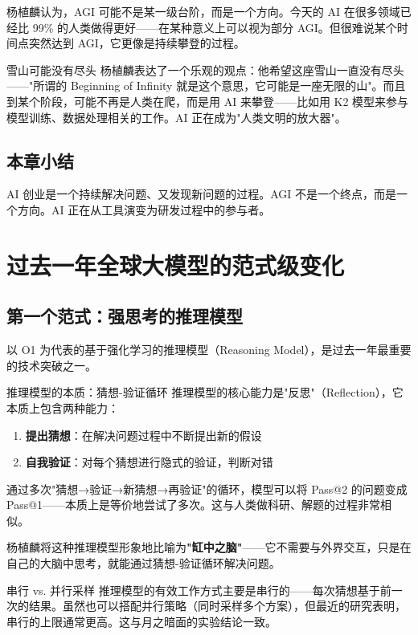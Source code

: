 \documentclass[a4paper]{article}
\begin{document}
杨植麟认为，AGI 可能不是某一级台阶，而是一个方向。今天的 AI 在很多领域已经比 99\% 的人类做得更好——在某种意义上可以视为部分 AGI。但很难说某个时间点突然达到 AGI，它更像是持续攀登的过程。

\begin{knowledgebox}{雪山可能没有尽头}
杨植麟表达了一个乐观的观点：他希望这座雪山一直没有尽头——"所谓的 Beginning of Infinity 就是这个意思，它可能是一座无限的山"。而且到某个阶段，可能不再是人类在爬，而是用 AI 来攀登——比如用 K2 模型来参与模型训练、数据处理相关的工作。AI 正在成为"人类文明的放大器"。
\end{knowledgebox}

\subsection{本章小结}

AI 创业是一个持续解决问题、又发现新问题的过程。AGI 不是一个终点，而是一个方向。AI 正在从工具演变为研发过程中的参与者。


\section{过去一年全球大模型的范式级变化}

\subsection{第一个范式：强思考的推理模型}

以 O1 为代表的基于强化学习的推理模型（Reasoning Model），是过去一年最重要的技术突破之一。

\begin{importantbox}{推理模型的本质：猜想-验证循环}
推理模型的核心能力是"反思"（Reflection），它本质上包含两种能力：
\begin{enumerate}
    \item \textbf{提出猜想}：在解决问题过程中不断提出新的假设
    \item \textbf{自我验证}：对每个猜想进行隐式的验证，判断对错
\end{enumerate}
通过多次"猜想→验证→新猜想→再验证"的循环，模型可以将 Pass@2 的问题变成 Pass@1——本质上是等价地尝试了多次。这与人类做科研、解题的过程非常相似。
\end{importantbox}

杨植麟将这种推理模型形象地比喻为\textbf{"缸中之脑"}——它不需要与外界交互，只是在自己的大脑中思考，就能通过猜想-验证循环解决问题。

\begin{knowledgebox}{串行 vs. 并行采样}
推理模型的有效工作方式主要是串行的——每次猜想基于前一次的结果。虽然也可以搭配并行策略（同时采样多个方案），但最近的研究表明，串行的上限通常更高。这与月之暗面的实验结论一致。
\end{knowledgebox}
\end{document}
